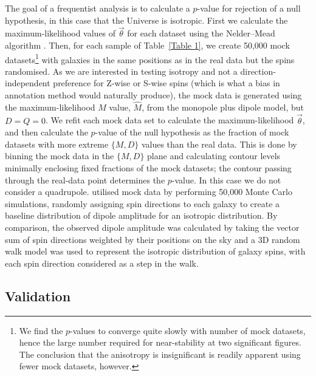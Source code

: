 \documentclass[fleqn,usenatbib,nofootinbib]{mnras}
\begin{document}
The goal of a frequentist analysis is to calculate a $p$-value for rejection of a null hypothesis, in this case that the Universe is isotropic. First we calculate the maximum-likelihood values of $\vec{\theta}$ for each dataset using the Nelder--Mead algorithm \citep{nelder1965simplex, gao2012implementing}. Then, for each sample of Table~\ref{Table 1}, we create 50,000 mock datasets\footnote{We find the $p$-values to converge quite slowly with number of mock datasets, hence the large number required for near-stability at two significant figures. The conclusion that the anisotropy is insignificant is readily apparent using fewer mock datasets, however.} with galaxies in the same positions as in the real data but the spins randomised. As we are interested in testing isotropy and not a direction-independent preference for Z-wise or S-wise spins (which is what a bias in annotation method would naturally produce), the mock data is generated using the maximum-likelihood $M$ value, $\widehat{M}$, from the monopole plus dipole model, but $D=Q=0$. We refit each mock data set to calculate the maximum-likelihood $\vec{\theta}$, and then calculate the $p$-value of the null hypothesis as the fraction of mock datasets with more extreme $\{M,D\}$ values than the real data. This is done by binning the mock data in the $\{M,D\}$ plane and calculating contour levels minimally enclosing fixed fractions of the mock datasets; the contour passing through the real-data point determines the $p$-value. In this case we do not consider a quadrupole. \citet{Iye2021} utilised mock data by performing 50,000 Monte Carlo simulations, randomly assigning spin directions to each galaxy to create a baseline distribution of dipole amplitude for an isotropic distribution. By comparison, the observed dipole amplitude was calculated by taking the vector sum of spin directions weighted by their positions on the sky and a 3D random walk model was used to represent the isotropic distribution of galaxy spins, with each spin direction considered as a step in the walk.

\subsection{Validation}
\label{sec:validation}
\end{document}
